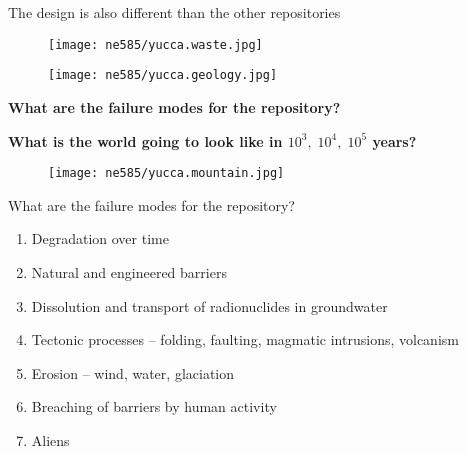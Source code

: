 \documentclass[aspectratio=1610,pdftex,dvipsnames,compress,xcolor={dvipsnames}]{beamer}
\begin{document}
\begin{frame}{The design is also different than the other repositories}
    \begin{figure}
        \centering
        \texttt{[image: ne585/yucca.waste.jpg]}
    \end{figure}
\end{frame}


\begin{frame}{}
    \begin{figure}
        \centering
        \texttt{[image: ne585/yucca.geology.jpg]}
    \end{figure}
\end{frame}


\begin{frame}[plain]{}
    \centering\LARGE\textbf{What are the failure modes for the repository?}
\end{frame}


\begin{frame}[plain]{}
    \centering\Large\textbf{What is the world going to look like in $10^3, \; 10^4, \; 10^5$ years?}
\end{frame}


\addtocounter{framenumber}{-2} 
\begin{frame}{}
    \begin{figure}
        \centering
        \texttt{[image: ne585/yucca.mountain.jpg]}
    \end{figure}
\end{frame}


\begin{frame}{What are the failure modes for the repository?}
    \begin{enumerate}[series=outerlist,topsep=0pt,itemsep=21pt,leftmargin=*,label=(\arabic*)]
        \item[]Degradation over time
        \item[]Natural and engineered barriers
        \item[]Dissolution and transport of radionuclides in groundwater
        \item[]Tectonic processes -- folding, faulting, magmatic intrusions, volcanism
        \item[]Erosion -- wind, water, glaciation
        \item[]Breaching of barriers by human activity
        \item[]Aliens
    \end{enumerate}
\end{frame}
\end{document}

